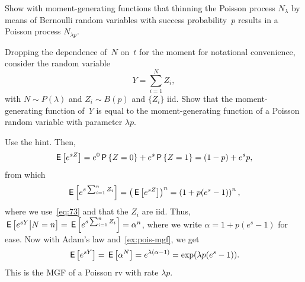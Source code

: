 \documentclass[queueing-book.tex]{subfiles}
\begin{document}



\begin{exercise}\label{ex:1}
 Show with moment-generating functions that thinning the Poisson process $N_\lambda$ by means of Bernoulli random variables with success probability~$p$ results in a Poisson process $N_{\lambda p}$.
\begin{hint}
Dropping the dependence of~$N$ on~$t$ for the moment for notational convenience, consider the random variable
 \begin{equation*}
 Y = \sum_{i=1}^N Z_i,
 \end{equation*}
 with $N\sim P(\lambda)$ and $Z_i\sim B(p)$ and $\{Z_{i}\}$ iid.
Show that the moment-generating function of~$Y$ is equal to the moment-generating function of a Poisson random variable with parameter $\lambda p$.
\end{hint}
\begin{solution}

Use the hint. Then,
\begin{equation*}
 \,\mathsf{E}\left[e^{s Z}\right] = e^0 \,\mathsf{P}\left\{Z=0\right\} + e^{s} \,\mathsf{P}\left\{Z=1\right\} = (1-p) + e^s p,
\end{equation*}
from which
\begin{equation*}
\,\mathsf{E}\left[e^{s\sum_{i=1}^n Z_i}\right] = \left(\,\mathsf{E}\left[e^{s Z}\right]\right)^n = \left(1 + p (e^s - 1)\right)^n,
\end{equation*}
where we use~\cref{eq:73} and that the $Z_i$  are iid.
Thus, $\,\mathsf{E}\left[e^{sY}\big|N=n\right] = \,\mathsf{E}\left[e^{s\sum_{i=1}^n Z_i}\right] = \alpha^{n}$, where we write $\alpha =1 + p (e^s - 1)$ for ease.
Now with Adam's law and~\cref{ex:pois-mgf}, we get
\begin{equation*}
\,\mathsf{E}\left[e^{sY}\right] = \,\mathsf{E}\left[\alpha^{N}\right] = e^{\lambda (\alpha - 1)} = \exp(\lambda p (e^s - 1)).
\end{equation*}
This is the MGF of a Poisson rv with rate $\lambda p$.


\end{solution}
\end{exercise}
\end{document}
